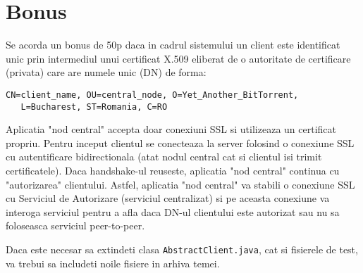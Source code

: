 \documentclass[a4paper]{article}
\begin{document}
\section{Bonus}
\label{sec7}

Se acorda un bonus de 50p daca in cadrul sistemului un client este identificat unic prin intermediul unui certificat X.509 eliberat de o autoritate de certificare (privata) care are numele unic (DN) de forma: 

\begin{verbatim}
CN=client_name, OU=central_node, O=Yet_Another_BitTorrent,
   L=Bucharest, ST=Romania, C=RO
\end{verbatim}

Aplicatia "nod central" accepta doar conexiuni SSL si utilizeaza un certificat propriu. Pentru inceput clientul se conecteaza la server folosind o conexiune SSL cu autentificare bidirectionala (atat nodul central cat si clientul isi trimit certificatele). Daca handshake-ul reuseste, aplicatia "nod central" continua cu "autorizarea" clientului. Astfel, aplicatia "nod central" va stabili o conexiune SSL cu Serviciul de Autorizare (serviciul centralizat) si pe aceasta conexiune va interoga serviciul pentru a afla daca DN-ul clientului este autorizat sau nu sa foloseasca serviciul peer-to-peer.

Daca este necesar sa extindeti clasa \verb|AbstractClient.java|, cat si fisierele de test, va trebui sa includeti noile fisiere in arhiva temei.
\end{document}
